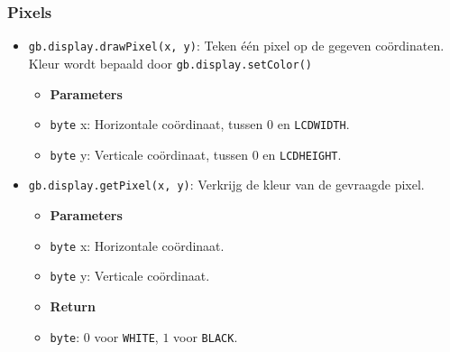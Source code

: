 \documentclass[a4paper,titlepage,12pt]{article}
\begin{document}
	\subsubsection{Pixels}
	\begin{itemize}
		\item \texttt{gb.display.drawPixel(x, y)}: Teken één pixel op de gegeven coördinaten. Kleur wordt bepaald door \texttt{gb.display.setColor()}
		\begin{itemize}
			\item [] \textbf{Parameters}
			\item \texttt{byte} x: Horizontale coördinaat, tussen $0$ en \texttt{LCDWIDTH}.
			\item \texttt{byte} y: Verticale coördinaat, tussen $0$ en \texttt{LCDHEIGHT}.
		\end{itemize}
	
		\item \texttt{gb.display.getPixel(x, y)}: Verkrijg de kleur van de gevraagde pixel.
		\begin{itemize}
			\item [] \textbf{Parameters}
			\item \texttt{byte} x: Horizontale coördinaat.
			\item \texttt{byte} y: Verticale coördinaat.
		\end{itemize}
		\begin{itemize}
			\item [] \textbf{Return}
			\item \texttt{byte}: $0$ voor \texttt{WHITE}, $1$ voor \texttt{BLACK}.
		\end{itemize}
	\end{itemize}
\end{document}
